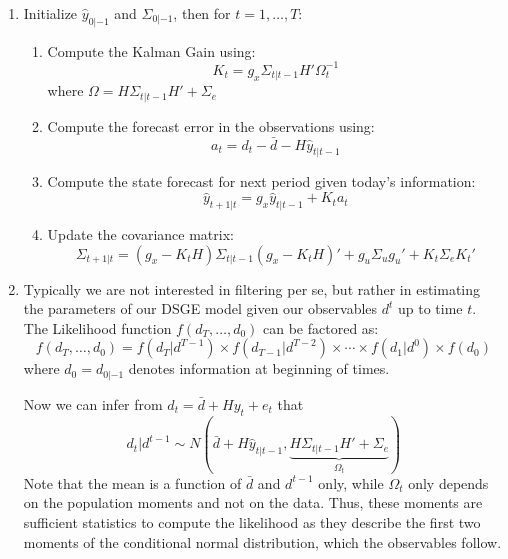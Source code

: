 \begin{enumerate}
\item Initialize \(\hat{y}_{0|-1}\) and \(\Sigma_{0|-1}\), then for \(t=1,\ldots ,T\):
\begin{enumerate}
\item Compute the Kalman Gain using:
\begin{equation*}
K_t = g_x \Sigma_{t|t-1} H' \Omega_t^{-1}
\end{equation*}
where \(\Omega=H \Sigma_{t|t-1} H' + \Sigma_e\)
\item Compute the forecast error in the observations using:
\begin{equation*}
a_t=d_t - \bar{d} - H \hat{y}_{t|t-1}
\end{equation*}
\item Compute the state forecast for next period given today's information:
\begin{equation*}
\hat{y}_{t+1|t} = g_x \hat{y}_{t|t-1} + K_t a_t
\end{equation*}
\item Update the covariance matrix:
\begin{equation*}
\Sigma_{t+1|t} = (g_x - K_t H) \Sigma_{t|t-1} (g_x - K_t H)' + g_u \Sigma_u g_u' + K_t \Sigma_e K_t'
\end{equation*}
\end{enumerate}

\item Typically we are not interested in filtering per se,
  but rather in estimating the parameters of our DSGE model given our observables \(d^t\) up to time \(t\).
The Likelihood function \(f(d_T,\ldots ,d_0)\) can be factored as:
\begin{equation*}
f(d_T,\ldots ,d_0) = f(d_T|d^{T-1}) \times f(d_{T-1}|d^{T-2}) \times \cdots \times f(d_1|d^{0}) \times f(d_0)
\end{equation*}
where \(d_0 = d_{0|-1}\) denotes information at beginning of times.

Now we can infer from \(d_t = \bar{d} + H y_t + e_t\) that
\begin{equation*}
d_t|d^{t-1} \sim N(\bar{d}+H\hat{y}_{t|t-1},\underbrace{H\Sigma_{t|t-1}H' + \Sigma_e}_{\Omega_t})
\end{equation*}
Note that the mean is a function of \(\bar{d}\) and \(d^{t-1}\) only,
  while \(\Omega_t\) only depends on the population moments and not on the data.
Thus, these moments are sufficient statistics to compute the likelihood
  as they describe the first two moments of the conditional normal distribution, which the observables follow.


\end{enumerate}
